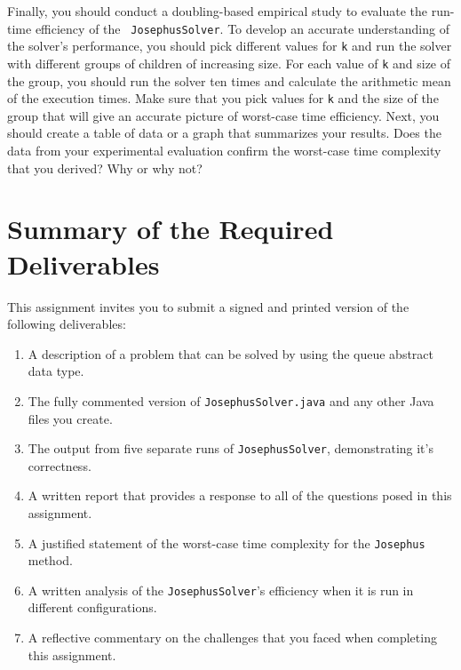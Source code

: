   Finally, you should conduct a doubling-based empirical study to evaluate the run-time efficiency of the {\tt
  JosephusSolver}.  To develop an accurate understanding of the solver's performance, you should pick different values
  for {\tt k} and run the solver with different groups of children of increasing size. For each value of {\tt k} and
  size of the group, you should run the solver ten times and calculate the arithmetic mean of the execution times. Make
  sure that you pick values for {\tt k} and the size of the group that will give an accurate picture of worst-case time
  efficiency. Next, you should create a table of data or a graph that summarizes your results. Does the data from your
  experimental evaluation confirm the worst-case time complexity that you derived? Why or why not?

\section*{Summary of the Required Deliverables}

  This assignment invites you to submit a signed and printed version of the following deliverables:

  \begin{enumerate}

  \item A description of a problem that can be solved by using the queue abstract data type.

  \item The fully commented version of {\tt JosephusSolver.java} and any other Java files you create.

  \item The output from five separate runs of {\tt JosephusSolver}, demonstrating it's correctness.

  \item A written report that provides a response to all of the questions posed in this assignment.

  \item A justified statement of the worst-case time complexity for the {\tt Josephus} method.

  \item A written analysis of the {\tt JosephusSolver}'s efficiency when it is run in different configurations.

  \item A reflective commentary on the challenges that you faced when completing this assignment.

  \end{enumerate}

